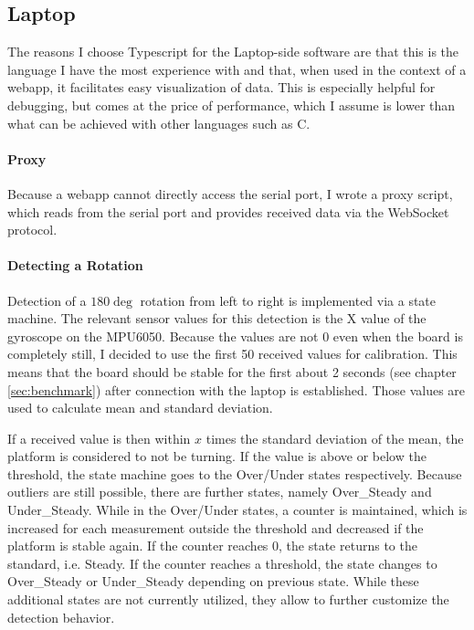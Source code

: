 \subsection{Laptop}
\label{subsec:laptop}

The reasons I choose Typescript for the Laptop-side software are that this is the language I have the most experience with and that, when used in the context of a webapp, it facilitates easy visualization of data.
This is especially helpful for debugging, but comes at the price of performance, which I assume is lower than what can be achieved with other languages such as C.

\paragraph{Proxy}
Because a webapp cannot directly access the serial port, I wrote a proxy script, which reads from the serial port and provides received data via the WebSocket protocol.

\paragraph{Detecting a Rotation}
Detection of a $180\deg$ rotation from left to right is implemented via a state machine.
The relevant sensor values for this detection is the X value of the gyroscope on the MPU6050.
Because the values are not 0 even when the board is completely still, I decided to use the first 50 received values for calibration.
This means that the board should be stable for the first about 2 seconds (see chapter \ref{sec:benchmark}) after connection with the laptop is established.
Those values are used to calculate mean and standard deviation.

If a received value is then within $x$ times the standard deviation of the mean, the platform is considered to not be turning.
If the value is above or below the threshold, the state machine goes to the Over/Under states respectively.
Because outliers are still possible, there are further states, namely Over_Steady and Under_Steady. 
While in the Over/Under states, a counter is maintained, which is increased for each measurement outside the threshold and decreased if the platform is stable again.
If the counter reaches 0, the state returns to the standard, i.e. Steady. If the counter reaches a threshold, the state changes to Over_Steady or Under_Steady depending on previous state.
While these additional states are not currently utilized, they allow to further customize the detection behavior.

